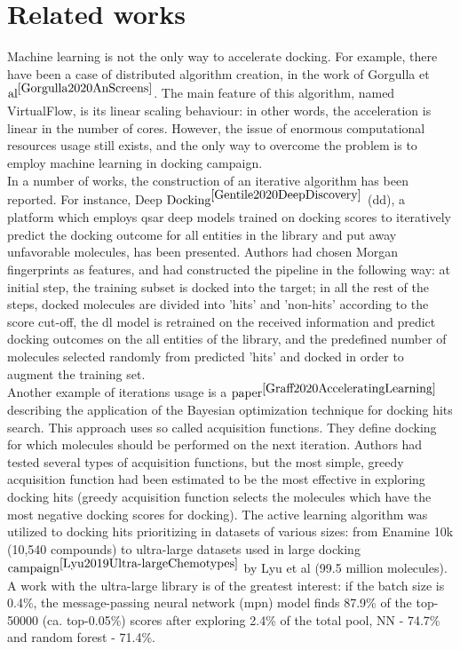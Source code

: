 \section{Related works}

Machine learning is not the only way to accelerate docking.
For example, there have been a case of distributed algorithm creation, in the work of Gorgulla et $\text{al}^{\cite{Gorgulla2020AnScreens}}$. 
The main feature of this algorithm, named VirtualFlow, is its linear scaling behaviour: in other words, the acceleration is linear in the number of cores.
However, the issue of enormous computational resources usage still exists, and the only way to overcome the problem is to employ machine learning in docking campaign.\\
 
In a number of works, the construction of an iterative algorithm has been reported.
For instance, Deep $\text{Docking}^{\cite{Gentile2020DeepDiscovery}}$ (\acrshort{dd}), a platform which employs \acrshort{qsar} deep models trained on docking scores to iteratively predict the docking outcome for all entities in the library and put away unfavorable molecules, has been presented.
Authors had chosen Morgan fingerprints as features, and had constructed the pipeline in the following way: at initial step, the training subset is docked into the target; in all the rest of the steps, docked molecules are divided into 'hits' and 'non-hits' according to the score cut-off, the \acrshort{dl} model is retrained on the received information and predict docking outcomes on the all entities of the library, and the predefined number of molecules selected randomly from predicted 'hits' and docked in order to augment the training set.\\

Another example of iterations usage is a $\text{paper}^{\cite{Graff2020AcceleratingLearning}}$ describing the application of the Bayesian optimization technique for docking hits search.
This approach uses so called acquisition functions.
They define docking for which molecules should be performed on the next iteration.
Authors had tested several types of acquisition functions, but the most simple, greedy acquisition function had been estimated to be the most effective in exploring docking hits
(greedy acquisition function selects the molecules which have the most negative docking scores for docking).
The active learning algorithm was utilized to docking hits prioritizing in datasets of various sizes: from Enamine 10k (10,540 compounds) to ultra-large datasets used in large docking $\text{campaign}^{\cite{Lyu2019Ultra-largeChemotypes}}$ by Lyu et al (99.5 million molecules).
A work with the ultra-large library is of the greatest interest: if the batch size is 0.4\%, the message-passing neural network (\acrshort{mpn}) model finds 87.9\% of the top-50000 (ca. top-0.05\%) scores after exploring 2.4\% of the total pool, NN - 74.7\% and random forest - 71.4\%.\\

